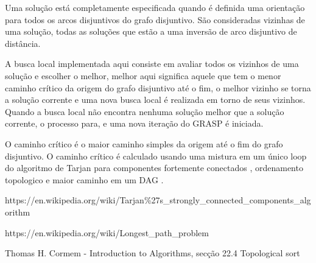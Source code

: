 \documentclass{article}
\begin{document}
Uma solução está completamente especificada quando é definida uma orientação
para todos os arcos disjuntivos do grafo disjuntivo. São consideradas
vizinhas de uma solução, todas as soluções que estão a uma inversão de
arco disjuntivo de distância.  

A busca local implementada aqui consiste em avaliar todos os vizinhos de uma 
solução e escolher o melhor, melhor aqui significa aquele que tem o menor 
caminho crítico da origem do grafo disjuntivo até o fim, o melhor vizinho 
se torna a solução corrente e uma nova busca local é realizada em torno de
seus vizinhos. Quando a busca local não encontra nenhuma solução melhor que 
a solução corrente, o processo para, e uma nova iteração do GRASP é iniciada.

O caminho crítico é o maior caminho simples da origem até o fim do grafo 
disjuntivo. O caminho crítico é calculado usando uma mistura em um único
loop do algoritmo de Tarjan para componentes fortemente conectados \cite{tarjan},
ordenamento topologico \cite{Cormem} e maior caminho em um DAG \cite{longestPath}.




\begin{thebibliography}{9}
    https://en.wikipedia.org/wiki/Tarjan\%27s\_strongly\_connected\_components\_algorithm
    
    https://en.wikipedia.org/wiki/Longest\_path\_problem
    
    Thomas  H. Cormem - Introduction to Algorithms, secção 22.4 Topological sort

\end{thebibliography}
\end{document}
